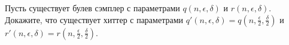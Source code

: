 Пусть существует булев сэмплер с параметрами $q(n, \epsilon, \delta)$ и $r(n, \epsilon, \delta)$. Докажите, что существует
хиттер с параметрами $q'(n, \epsilon, \delta) = q(n, \frac{\epsilon}{2}, \frac{\delta}{2})$ и $r'(n, \epsilon, \delta) = r(n,
\frac{\epsilon}{2}, \frac{\delta}{2})$.